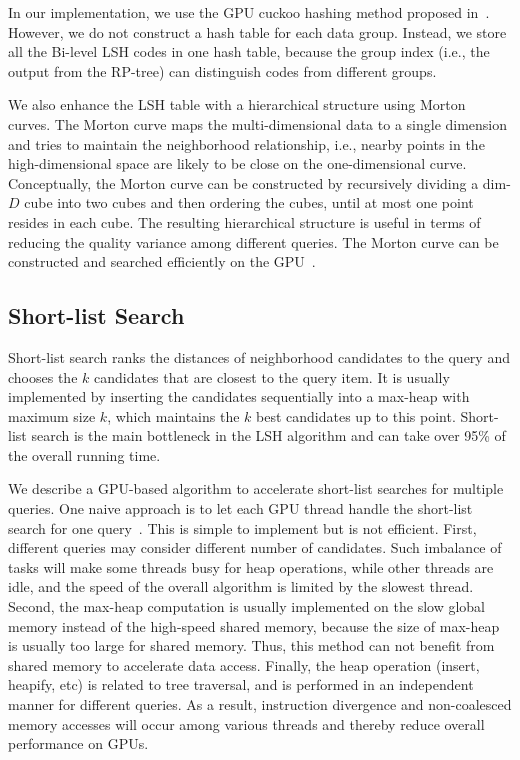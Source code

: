 In our implementation, we use the GPU cuckoo hashing method proposed in~\cite{Alcantara:2009:RPH}. However, we do not construct a hash table for each data group. Instead, we store all the Bi-level LSH codes in one hash table, because the group index (i.e., the output from the RP-tree) can distinguish codes from different groups.

We also enhance the LSH table with a hierarchical structure using Morton curves. The Morton curve maps the multi-dimensional data to a
single dimension and tries to maintain the neighborhood relationship, i.e., nearby points in the high-dimensional space are likely to be close on the one-dimensional curve. Conceptually, the Morton curve can be constructed by recursively
dividing a dim-$D$ cube into two cubes and then ordering the cubes, until at most one point resides in each cube. The resulting hierarchical structure is useful in terms of reducing the quality variance among different queries. The Morton curve can be constructed and searched efficiently on the GPU~\cite{LauterbachGSLM09}.


\subsection{Short-list Search}
\label{sec:6:gpu:slsearch}
Short-list search ranks the distances of neighborhood candidates to the query and chooses the $k$ candidates that are closest to the query item. It is usually implemented by inserting the candidates sequentially into a max-heap with maximum size $k$, which maintains the $k$ best candidates up to this point. Short-list search is the main bottleneck in the LSH algorithm and can take over 95\% of the overall running time.

We describe a GPU-based algorithm to accelerate short-list searches for multiple queries. One naive approach is to let each GPU thread handle the short-list search for one query~\cite{Pan:IROS:2010}. This is simple to implement but is not efficient. First, different queries may consider different number of candidates. Such imbalance of tasks will make some threads busy for heap operations, while other threads are idle, and the speed of the overall algorithm is limited by the slowest thread. Second, the max-heap computation is usually implemented on the slow global memory instead of the high-speed shared memory, because the size of max-heap is usually too large for shared memory. Thus, this method can not benefit from shared memory to accelerate data access. Finally, the heap operation (insert, heapify, etc) is related to tree traversal, and is performed in an independent manner for different queries. As a result, instruction divergence and non-coalesced memory accesses will occur among various threads and thereby reduce overall performance on GPUs.


